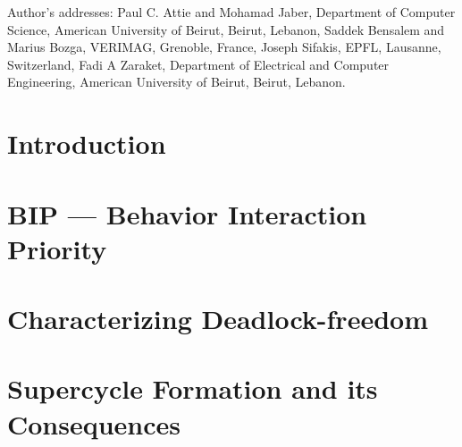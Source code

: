 \documentclass[prodmode,acmtosem]{acmsmall} %
\begin{document}



\begin{bottomstuff}
Author's addresses: Paul C. Attie {and} Mohamad Jaber,
Department of Computer Science, American University of Beirut, Beirut, Lebanon,
Saddek Bensalem and Marius Bozga, VERIMAG, Grenoble, France,
Joseph Sifakis, EPFL, Lausanne, Switzerland, 
Fadi A Zaraket, Department of Electrical and Computer Engineering,
 American University of Beirut, Beirut, Lebanon.
\end{bottomstuff}











\maketitle



\section{Introduction}
\label{s:intro}



\section{BIP --- Behavior Interaction Priority}
\label{s:bip}



\section{Characterizing Deadlock-freedom}
\label{s:characterize}



\section{Supercycle Formation and its Consequences}
\label{secn:scFormation}

\end{document}
